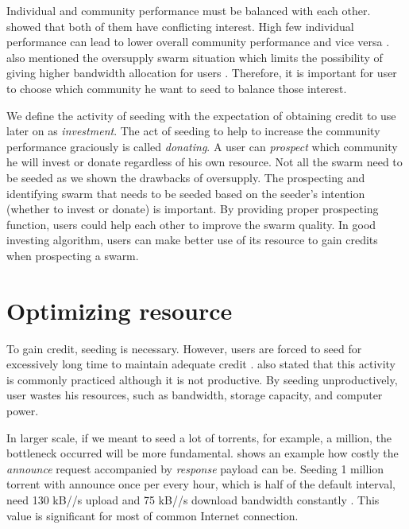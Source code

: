 Individual and community performance must be balanced with each other. \citeauthor{2015:sustainabilitypt:vinko} showed that both of them have conflicting interest. High few individual performance can lead to lower overall community performance and vice versa \cite{2015:sustainabilitypt:vinko}.  \citeauthor{2013:survivepriv:jia} also mentioned the oversupply swarm situation which limits the possibility of giving higher bandwidth allocation for users \cite{2013:survivepriv:jia}. Therefore, it is important for user to choose which community he want to seed to balance those interest.

We define the activity of seeding with the expectation of obtaining credit to use later on as \textit{investment}. The act of seeding to help to increase the community performance graciously is called \textit{donating}. A user can \textit{prospect} which community he will invest or donate regardless of his own resource. Not all the swarm need to be seeded as we shown the drawbacks of oversupply. The prospecting and identifying swarm that needs to be seeded based on the seeder's intention (whether to invest or donate) is important. By providing proper prospecting function, users could help each other to improve the swarm quality. In good investing algorithm, users can make better use of its resource to gain credits when prospecting a swarm. 


\section{Optimizing resource}
To gain credit, seeding is necessary. However, users are forced to seed for excessively long time to maintain adequate credit \cite{2013:survivepriv:jia}. \citeauthor{2013:survivepriv:jia} also stated that this activity is commonly practiced although it is not productive. By seeding unproductively, user wastes his resources, such as bandwidth, storage capacity, and computer power.

In larger scale, if we meant to seed a lot of torrents, for example, a million, the bottleneck occurred will be more fundamental. \citeauthor{2012:milliontorrent:arvid} shows an example how costly the \textit{announce} request accompanied by \textit{response} payload can be. Seeding 1 million torrent with announce once per every hour, which is half of the default interval, need 130 kB//s upload and 75 kB//s download bandwidth constantly \cite{2012:milliontorrent:arvid}. This value is significant for most of common Internet connection.

